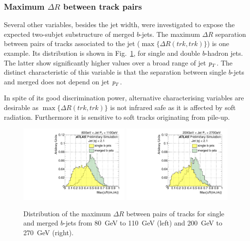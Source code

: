 \subsubsection{Maximum $\Delta R$ between track pairs}  

Several other variables, besides the jet width, were investigated to expose the expected two-subjet substructure of merged $b$-jets.  The maximum $\Delta R$ separation between pairs of tracks associated to the jet ($\max\{\Delta R(trk,trk)\}$) is one example. %
Its distribution is shown in Fig.~\ref{fig:drmaxsinglemerged}, for single and double $b$-hadron jets. The latter show significantly higher values over a broad range of jet ${\emph{p}_{T}}$. The distinct characteristic of this variable is that the separation between single $b$-jets and merged does not depend on jet ${\emph{p}_{T}}$. 

In spite of its good discrimination power, alternative characterising variables are desirable as $\max\{\Delta R(trk,trk)\}$ is not infrared safe as it is affected by soft radiation. Furthermore it is  sensitive to soft tracks originating from pile-up. 

\begin{figure}[tp]
\centering
\includegraphics[width=0.49\textwidth]{FIGS/VarsSingleMerged/drmax080.pdf}
\includegraphics[width=0.49\textwidth]{FIGS/VarsSingleMerged/drmax200.pdf}
\caption{Distribution of the maximum $\Delta R$ between pairs of tracks for single and merged $b$-jets from 80~GeV to 110~GeV (left) and 200~GeV to 270~GeV (right).}
\label{fig:drmaxsinglemerged}
\end{figure}


